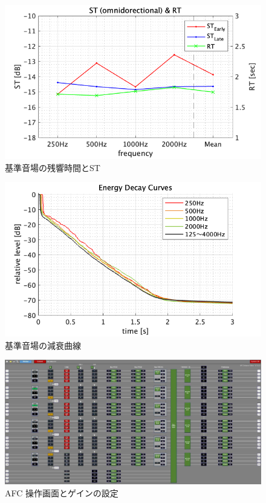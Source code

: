 \documentclass[11pt,a4j]{jreport}
\begin{document}
\newpage

\begin{figure}[H]
  \centering
  \includegraphics[width=.8\linewidth]{images/fieldO_stRt.png}
  \caption{基準音場の残響時間とST}
  \label{fig:基準音場の残響時間とST}
\end{figure}

\begin{figure}[H]
  \centering
  \includegraphics[width=.8\linewidth]{images/fieldO_EnergyDecayCurve.png}
  \caption{基準音場の減衰曲線}
  \label{fig:基準音場の減衰曲線}
\end{figure}
\newpage

\begin{figure}[H]
  \centering
  \includegraphics[width=.9\linewidth]{images/experimentField/afcParameters/base01overall.jpg}
  \caption{AFC 操作画面とゲインの設定}
  \label{fig:AFC操作画面}
\end{figure}
\end{document}
